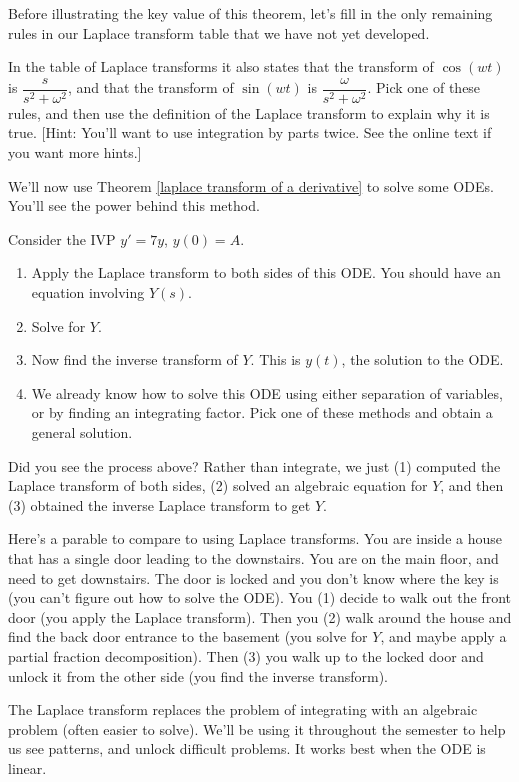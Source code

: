 Before illustrating the key value of this theorem, let's fill in the only remaining rules in our Laplace transform table that we have not yet developed. 
\begin{problem}
 In the table of Laplace transforms it also states that the transform of 
$\cos(wt)$ is $\dfrac{s}{s^2+\omega^2}$, and that the transform of $\sin(wt)$  is $\dfrac{\omega}{s^2+\omega^2}$. Pick one of these rules, and then use the definition of the Laplace transform to explain why it is true.  [Hint:  You'll want to use integration by parts twice. See the online text if you want more hints.]
\end{problem}

We'll now use Theorem \ref{laplace transform of a derivative} to solve some ODEs.  You'll see the power behind this method.
\begin{problem}
 Consider the IVP $y'=7y$, $y(0)=A$.  
\begin{enumerate}
 \item Apply the Laplace transform to both sides of this ODE.  You should have an equation involving $Y(s)$. 
 \item Solve for $Y$.  
 \item Now find the inverse transform of $Y$. This is $y(t)$, the solution to the ODE.
 \item We already know how to solve this ODE using either separation of variables, or by finding an integrating factor. Pick one of these methods and obtain a general solution.
\end{enumerate}
\end{problem}
Did you see the process above?  Rather than integrate, we just (1) computed the Laplace transform of both sides, (2) solved an algebraic equation for $Y$, and then (3) obtained the inverse Laplace transform to get $Y$.  

Here's a parable to compare to using Laplace transforms.  You are inside a house that has a single door leading to the downstairs.  You are on the main floor, and need to get downstairs.  The door is locked and you don't know where the key is (you can't figure out how to solve the ODE).  You (1) decide to walk out the front door (you apply the Laplace transform).  Then you (2) walk around the house and find the back door entrance to the basement (you solve for $Y$, and maybe apply a partial fraction decomposition).  Then (3) you walk up to the locked door and unlock it from the other side (you find the inverse transform).

The Laplace transform replaces the problem of integrating with an algebraic problem (often easier to solve). We'll be using it throughout the semester to help us see patterns, and unlock difficult problems.  It works best when the ODE is linear.

